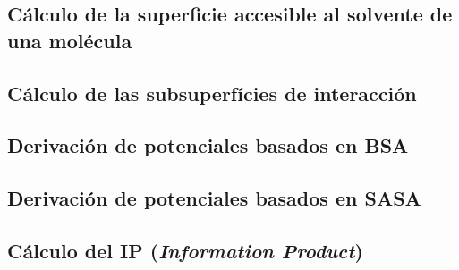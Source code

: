 \subsection{Cálculo de la superficie accesible al solvente de una molécula}
\par
\subsection{Cálculo de las subsuperfícies de interacción}
\par
\subsection{Derivación de potenciales basados en BSA}
\par
\subsection{Derivación de potenciales basados en SASA}
\par
\subsection{Cálculo del IP (\textit{Information Product})}
